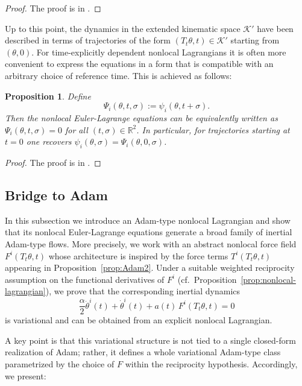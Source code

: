 \documentclass{article} %
\newtheorem{proposition}{Proposition}
\begin{document}
\begin{proof}
The proof is in \cite{Heredia2021, heredia2025nonlocalmechanics}.
\end{proof}

Up to this point, the dynamics in the extended kinematic space $\mathcal{K}'$ have been described in terms of trajectories of the form $(T_t\theta,t)\in\mathcal{K}'$ starting from $(\theta,0)$. For time-explicitly dependent nonlocal Lagrangians it is often more convenient to express the equations in a form that is compatible with an arbitrary choice of reference time. This is achieved as follows:

\begin{proposition}
Define
\begin{equation}\label{chap-EOMmc}
\Psi_i(\theta,t,\sigma):=\psi_i(\theta,t+\sigma).
\end{equation}
Then the nonlocal Euler-Lagrange equations can be equivalently written as $\Psi_i(\theta,t,\sigma)=0$ for all $(t,\sigma)\in\mathbb{R}^2$.
In particular, for trajectories starting at $t=0$ one recovers $\psi_i(\theta,\sigma)=\Psi_i(\theta,0,\sigma)$.
\end{proposition}

\begin{proof}
The proof is in \cite{Heredia2021, heredia2025nonlocalmechanics}.
\end{proof}

\subsection{Bridge to Adam}\label{sec:Adam}
In this subsection we introduce an Adam-type nonlocal Lagrangian and show that its nonlocal Euler-Lagrange equations generate a broad family of inertial Adam-type flows. More precisely, we work with an abstract nonlocal force field $F^i(T_t\theta,t)$ whose architecture is inspired by the force terms $T^i(T_t\theta,t)$ appearing in Proposition~\ref{prop:Adam2}. Under a suitable weighted reciprocity assumption on the functional derivatives of $F^i$ (cf.~Proposition~\ref{prop:nonlocal-lagrangian}), we prove that the corresponding inertial dynamics
\[
\frac{\alpha}{2}\ddot\theta^i(t)+\dot\theta^i(t)+a(t)\,F^i(T_t\theta,t)=0
\]
is variational and can be obtained from an explicit nonlocal Lagrangian.

A key point is that this variational structure is not tied to a single closed-form realization of Adam; rather, it defines a whole variational Adam-type class parametrized by the choice of $F$ within the reciprocity hypothesis. Accordingly, we present:
\end{document}
